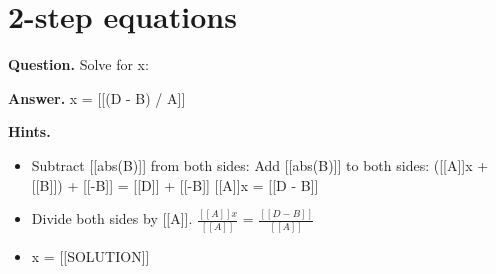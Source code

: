 \documentclass{article}
\begin{document}
\section*{2-step equations}
\textbf{Question.} Solve for x:

\textbf{Answer.} x = [[(D - B) /  A]]

\textbf{Hints.}
\begin{itemize}
  \item Subtract [[abs(B)]] from both sides:
                Add [[abs(B)]] to both sides:
                ([[A]]x + [[B]]) + [[-B]] = [[D]] + [[-B]]
                [[A]]x = [[D - B]]
  \item Divide both sides by [[A]].
                $\frac{[[A]]x}{[[A]]}$ = $\frac{[[D - B]]}{[[A]]}$
  \item x = [[SOLUTION]]
\end{itemize}
\end{document}
